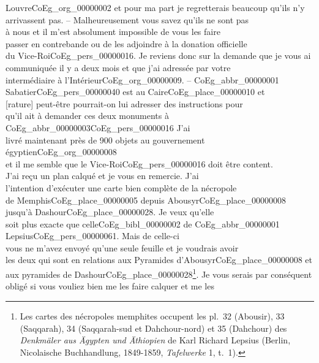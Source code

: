 \documentclass{book}
\begin{document}
Louvre\gls{CoEg_org_00000002} et pour ma part je regretterais beaucoup qu’ils n’y\\
arrivassent pas. – Malheureusement vous savez qu’ils ne sont pas\\
à nous et il m’est absolument impossible de vous les faire\\
passer en contrebande ou de les adjoindre à la donation officielle\\
du Vice-Roi\gls{CoEg_pers_00000016}. Je reviens donc sur la demande que je vous ai\\
communiquée il y a deux mois et que j’ai adressée par votre\\
intermédiaire à l’Intérieur\gls{CoEg_org_00000009}. – \gls{CoEg_abbr_00000001} Sabatier\gls{CoEg_pers_00000040} est au Caire\gls{CoEg_place_00000010} et\\
{[rature]} peut-être pourrait-on lui adresser des instructions pour\\
qu’il ait à demander ces deux monuments à \gls{CoEg_abbr_00000003}\gls{CoEg_pers_00000016} J’ai\\
livré maintenant près de 900 objets au gouvernement égyptien\gls{CoEg_org_00000008}\\
et il me semble que le Vice-Roi\gls{CoEg_pers_00000016} doit être content.\\
\indent J’ai reçu un plan calqué et je vous en remercie. J’ai\\
l’intention d’exécuter une carte bien complète de la nécropole\\
de Memphis\gls{CoEg_place_00000005} depuis Abousyr\gls{CoEg_place_00000008} jusqu’à Dashour\gls{CoEg_place_00000028}. Je veux qu’elle\\
soit plus exacte que celle\gls{CoEg_bibl_00000002} de \gls{CoEg_abbr_00000001} Lepsius\gls{CoEg_pers_00000061}. Mais de celle-ci\\
vous ne m’avez envoyé qu’une seule feuille et je voudrais avoir\\
les deux qui sont en relations aux Pyramides d’Abousyr\gls{CoEg_place_00000008} et\\
aux pyramides de Dashour\gls{CoEg_place_00000028}\footnote{Les cartes des nécropoles memphites occupent les pl.~32 (Abousir), 33 (Saqqarah), 34 (Saqqarah-sud et Dahchour-nord) et 35 (Dahchour) des \textit{Denkmäler aus Ägypten und Äthiopien} de Karl Richard Lepsius (Berlin, Nicolaische Buchhandlung, 1849-1859, \textit{Tafelwerke} 1, t.~1).}. Je vous serais par conséquent\\
obligé si vous vouliez bien me les faire calquer et me les\\
\end{document}

